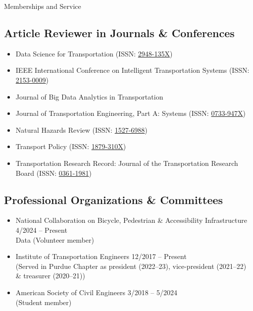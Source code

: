 \documentclass{CV} %
\begin{document}
\begin{rSection}{Memberships and Service}
    \subsection*{Article Reviewer in Journals \& Conferences}
    \begin{itemize}
        \item Data Science for Transportation (ISSN: \href{https://link.springer.com/journal/42421}{2948-135X})
        \item IEEE International Conference on Intelligent Transportation Systems (ISSN: \href{https://ieee-itss.org/conf/itsc/}{2153-0009})
        \item Journal of Big Data Analytics in Transportation 
        \item Journal of Transportation Engineering, Part A: Systems (ISSN: \href{https://ascelibrary.org/journal/jtepbs}{0733-947X})
        \item Natural Hazards Review (ISSN: \href{https://ascelibrary.org/journal/NHREFO}{1527-6988})
        \item Transport Policy (ISSN: \href{https://www.sciencedirect.com/journal/transport-policy}{1879-310X})
        \item Transportation Research Record: Journal of the Transportation Research Board (ISSN: \href{https://journals.sagepub.com/home/trr}{0361-1981})
    \end{itemize}
    \subsection*{Professional Organizations \& Committees}
    \begin{itemize}
        \item National Collaboration on Bicycle, Pedestrian \& Accessibility Infrastructure \hfill 4/2024 – Present \\
        Data (Volunteer member)
        \item Institute of Transportation Engineers \hfill 12/2017 – Present \\
        (Served in Purdue Chapter as president (2022–23), vice-president (2021–22) \& treasurer (2020–21))
        \item American Society of Civil Engineers \hfill 3/2018 – 5/2024
        \\ (Student member)
    \end{itemize}

\end{rSection}
\end{document}
